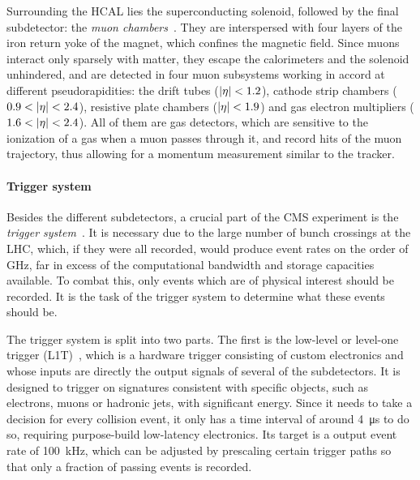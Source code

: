 Surrounding the HCAL lies the superconducting solenoid, followed by the final subdetector: the \textit{muon chambers}~\cite{CMS:1997iti,Pozzobon:2701333}. They are interspersed with four layers of the iron return yoke of the magnet, which confines the magnetic field. Since muons interact only sparsely with matter, they escape the calorimeters and the solenoid unhindered, and are detected in four muon subsystems working in accord at different pseudorapidities: the drift tubes ($|\eta| < 1.2$), cathode strip chambers ($0.9 < |\eta| < 2.4$), resistive plate chambers ($|\eta| < 1.9$) and gas electron multipliers ($1.6 < |\eta| < 2.4$). All of them are gas detectors, which are sensitive to the ionization of a gas when a muon passes through it, and record hits of the muon trajectory, thus allowing for a momentum measurement similar to the tracker.

\paragraph{Trigger system}
Besides the different subdetectors, a crucial part of the CMS experiment is the \textit{trigger system}~\cite{CMS-TRG-12-001}. It is necessary due to the large number of bunch crossings at the LHC, which, if they were all recorded, would produce event rates on the order of GHz, far in excess of the computational bandwidth and storage capacities available. To combat this, only events which are of physical interest should be recorded. It is the task of the trigger system to determine what these events should be.

The trigger system is split into two parts. The first is the low-level or level-one trigger (L1T)~\cite{CMS:TRG-17-001}, which is a hardware trigger consisting of custom electronics and whose inputs are directly the output signals of several of the subdetectors. It is designed to trigger on signatures consistent with specific objects, such as electrons, muons or hadronic jets, with significant energy. Since it needs to take a decision for every collision event, it only has a time interval of around \SI{4}{\micro\second} to do so, requiring purpose-build low-latency electronics. Its target is a output event rate of 100~kHz, which can be adjusted by prescaling certain trigger paths so that only a fraction of passing events is recorded.

